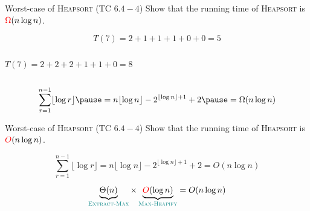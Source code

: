 \begin{frame}{}
  \begin{exampleblock}{Worst-case of \textsc{Heapsort} (TC $6.4-4$)}
    Show that the  running time of \textsc{Heapsort} is $\textcolor{red}{\Omega}(n \log n)$.
  \end{exampleblock}

  \vspace{0.30cm}
\end{frame}

\begin{frame}{}
  \begin{center}
    {}
  \end{center}

  \pause

  \pause
  \vspace{-0.30cm}
  \[
    T(7) = 2 + 1 + 1 + 1 + 0 + 0 = 5
  \]

\end{frame}

\begin{frame}{}
  \begin{columns}
      \pause
      \[
        T(7) = 2 + 2 + 2 + 1 + 1 + 0 = 8
      \]
      \pause 
      \begin{center}
        {\footnotesize {}}
      \end{center}
      \pause
  \end{columns}

  \pause
  \vspace{0.60cm}
  \[
    \sum_{r=1}^{n-1} \lfloor \log r \rfloor \pause = n \lfloor \log  n \rfloor - 2^{\lfloor \log n \rfloor + 1} + 2 \pause = \Omega(n \log n)
  \]
\end{frame}

\begin{frame}{}
  \begin{exampleblock}{Worst-case of \textsc{Heapsort} (TC $6.4-4$)}
    Show that the  running time of \textsc{Heapsort} is $\textcolor{red}{O}(n \log n)$.
  \end{exampleblock}

  \pause
  \[
    \sum_{r=1}^{n-1} \lfloor \log r \rfloor = n \lfloor \log  n \rfloor - 2^{\lfloor \log n \rfloor + 1} + 2 = O(n \log n)
  \]

  \pause
  \vspace{0.30cm}
  \centerline{}

  \pause
  \vspace{0.30cm}
  \[
    \underbrace{\Theta(n)}_{\textcolor{teal}{\textsc{Extract-Max}}} \times \underbrace{\textcolor{red}{O}(\log n)}_{\textcolor{teal}{\textsc{Max-Heapify}}} = O(n \log n)
  \]
\end{frame}

